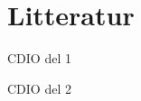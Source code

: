 \documentclass[12pt,oneside,a4paper,english]{article}
\begin{document}
\newpage
{} 


%

{}
\section*{Litteratur} \label{bibliography}
CDIO del 1

CDIO del 2

\label{endOfDoc}
\end{document}
